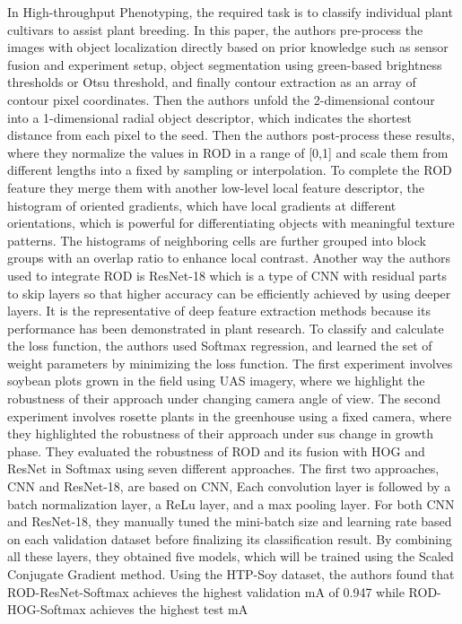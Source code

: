 In High-throughput Phenotyping, the required task is to classify individual plant cultivars to assist plant breeding\cite{9150887}.
In this paper, the authors pre-process the images with object localization directly based on prior knowledge such as sensor fusion and experiment setup,
object segmentation using green-based brightness thresholds or Otsu threshold, and finally contour extraction as an array of contour pixel coordinates.
Then the authors unfold the 2-dimensional contour into a 1-dimensional radial object descriptor, which indicates the shortest distance from each pixel to the seed.
Then the authors post-process these results, where they normalize the values in ROD in a range of [0,1] and scale them from different lengths into a fixed
by sampling or interpolation. To complete the ROD feature they merge them with another low-level local feature descriptor, the histogram of oriented gradients,
which have local gradients at different orientations, which is powerful for differentiating objects with meaningful texture patterns. The histograms of neighboring
cells are further grouped into block groups with an overlap ratio to enhance local contrast. Another way the authors used to integrate ROD is ResNet-18\cite{he2016deep} which is a
type of CNN with residual parts to skip layers so that higher accuracy can be efficiently achieved by using deeper layers. It is the representative of deep feature
extraction methods because its performance has been demonstrated in plant research. To classify and calculate the loss function, the authors used Softmax regression,
and learned the set of weight parameters by minimizing the loss function. The first experiment involves soybean plots grown in the field using UAS imagery, where we
highlight the robustness of their approach under changing camera angle of view. The second experiment involves rosette plants in the greenhouse using a fixed camera,
where they highlighted the robustness of their approach under sus change in growth phase. They evaluated the robustness of ROD and its fusion with HOG and ResNet in
Softmax using seven different approaches. The first two approaches, CNN and ResNet-18, are based on CNN, Each convolution layer is followed by a batch normalization
layer, a ReLu layer, and a max pooling layer. For both CNN and ResNet-18, they manually tuned the mini-batch size and learning rate based on each validation dataset
before finalizing its classification result. By combining all these layers, they obtained five models, which will be trained using the Scaled Conjugate Gradient method.
Using the HTP-Soy dataset, the authors found that ROD-ResNet-Softmax achieves the highest validation mA of 0.947 while ROD-HOG-Softmax achieves the highest test mA
